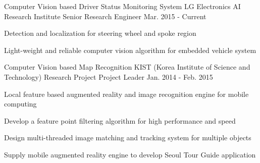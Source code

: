 


\begin{cventries}

  \cventry
    {Computer Vision based Driver Status Monitoring System} %
    {LG Electronics AI Research Institute} %
    {Senior Research Engineer} %
    {Mar. 2015 - Current} %
    {
      \begin{cvitems} %
        \item {Detection and localization for steering wheel and spoke region}
        \item {Light-weight and reliable computer vision algorithm for embedded vehicle system}
      \end{cvitems}
    }

  \cventry
    {Computer Vision based Map Recognition} %
    {KIST (Korea Institute of Science and Technology) Research Project} %
    {Project Leader} %
    {Jan. 2014 - Feb. 2015} %
    {
      \begin{cvitems} %
        \item {Local feature based augmented reality and image recognition engine for mobile computing}
        \item {Develop a feature point filtering algorithm for high performance and speed}
        \item {Design multi-threaded image matching and tracking system for multiple objects}
        \item {Supply mobile augmented reality engine to develop Seoul Tour Guide application}
      \end{cvitems}
    }


\end{cventries}
